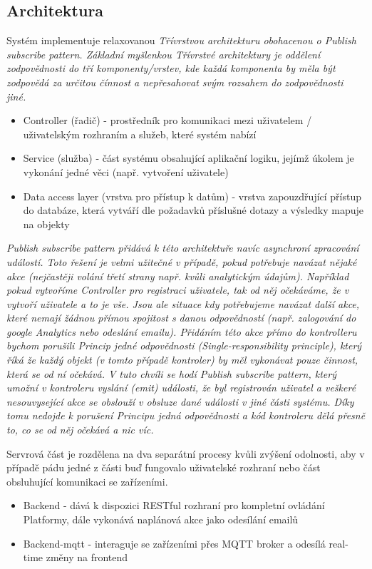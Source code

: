 \subsection{Architektura}
Systém implementuje relaxovanou \itshape{Třívrstvou architekturu} obohacenou o \itshape{Publish subscribe pattern}. Základní myšlenkou Třívrstvé architektury je oddělení zodpovědnosti do tří komponenty/vrstev, kde každá komponenta by měla být zodpovědá za určitou čínnost a nepřesahovat svým rozsahem do zodpovědnosti jiné.
\begin{itemize}
    \item Controller (řadič) - prostředník pro komunikaci mezi uživatelem / uživatelským rozhraním a služeb, které systém nabízí
    \item Service (služba) - část systému obsahující aplikační logiku, jejímž úkolem je vykonání jedné věci (např. vytvoření uživatele)
    \item Data access layer (vrstva pro přístup k datům) - vrstva zapouzdřující přístup do databáze, která vytváří dle požadavků příslušné dotazy a výsledky mapuje na objekty
\end{itemize}
\itshape{Publish subscribe pattern} přidává k této architektuře navíc asynchroní zpracování událostí. Toto řešení je velmi užitečné v případě, pokud potřebuje navázat nějaké akce (nejčastěji volání třetí strany např. kvůli analytickým údajům). Například pokud vytvoříme Controller pro registraci uživatele, tak od něj očekáváme, že v vytvoří uživatele a to je vše. Jsou ale situace kdy potřebujeme navázat další akce, které nemají žádnou přímou spojitost s danou odpovědností (např. zalogování do google Analytics nebo odeslání emailu). Přidáním této akce přímo do kontrolleru bychom porušili Princip jedné odpovědnosti (Single-responsibility principle), který říká že každý objekt (v tomto případě kontroler) by měl vykonávat pouze činnost, která se od ní očekává. V tuto chvíli se hodí  \itshape{Publish subscribe pattern}, který umožní v kontroleru vyslání (emit) události, že byl registrován uživatel a veškeré nesouvysející akce se obslouží v obsluze dané události v jiné části systému. Díky tomu nedojde k porušení Principu jedná odpovědnosti a kód kontroleru dělá přesně to, co se od něj očekává a nic víc.

Servrová část je rozdělena na dva separátní procesy kvůli zvýšení odolnosti, aby v případě pádu jedné z části buď fungovalo uživatelské rozhraní nebo část obsluhující komunikaci se zařízeními.
\begin{itemize}
    \item Backend - dává k dispozici RESTful rozhraní pro kompletní ovládání Platformy, dále vykonává naplánová akce jako odesílání emailů
    \item Backend-mqtt - interaguje se zařízeními přes MQTT broker a odesílá real-time změny na frontend
\end{itemize}

